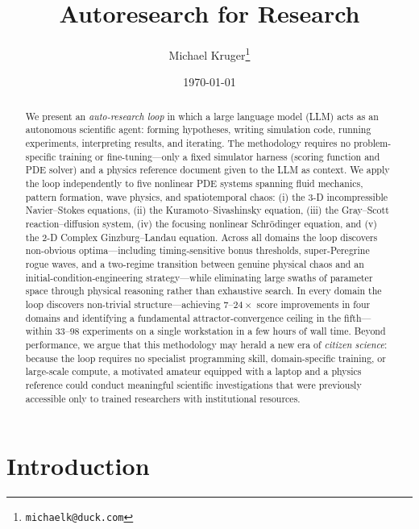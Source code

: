 \documentclass[11pt]{article}
\title{\textbf{Autoresearch for Research}}
\author{
  Michael Kruger\thanks{\texttt{michaelk@duck.com}}
}
\date{\today}
\begin{document}
\maketitle

\begin{abstract}
We present an \emph{auto-research loop} in which a large language model (LLM)
acts as an autonomous scientific agent: forming hypotheses, writing simulation
code, running experiments, interpreting results, and iterating.
The methodology requires no problem-specific training or fine-tuning---only
a fixed simulator harness (scoring function and PDE solver) and a physics
reference document given to the LLM as context.
We apply the loop independently to five nonlinear PDE systems spanning
fluid mechanics, pattern formation, wave physics, and spatiotemporal chaos:
(i) the 3-D incompressible Navier--Stokes equations,
(ii) the Kuramoto--Sivashinsky equation,
(iii) the Gray--Scott reaction--diffusion system,
(iv) the focusing nonlinear Schr\"odinger equation,
and (v) the 2-D Complex Ginzburg--Landau equation.
Across all domains the loop discovers non-obvious optima---including
timing-sensitive bonus thresholds, super-Peregrine rogue waves, and
a two-regime transition between genuine physical chaos and an
initial-condition-engineering strategy---while eliminating large swaths
of parameter space through physical reasoning rather than exhaustive search.
In every domain the loop discovers non-trivial structure---achieving
$7$--$24\times$ score improvements in four domains and identifying
a fundamental attractor-convergence ceiling in the fifth---within
$33$--$98$ experiments on a single workstation in a few hours of wall time.
Beyond performance, we argue that this methodology may herald a new era of
\emph{citizen science}: because the loop requires no specialist programming
skill, domain-specific training, or large-scale compute, a motivated amateur
equipped with a laptop and a physics reference could conduct meaningful
scientific investigations that were previously accessible only to trained
researchers with institutional resources.
\end{abstract}

\section{Introduction}
\label{sec:intro}
\end{document}
